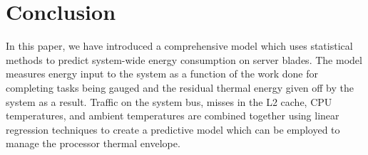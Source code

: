 \documentclass[times, 10pt, finalversion]{usetex-v1}
\begin{document}
\section{Conclusion}
\label{sec:conclusions}
In this paper, we have introduced a comprehensive model which uses
statistical methods to predict system-wide energy consumption  on server
blades.   The model measures energy input to the system as a function
of the work done for completing  tasks being gauged and the residual thermal
energy given off by the system as a result.   Traffic on the
system bus, misses in the L2 cache, CPU temperatures, and ambient
temperatures are combined together using linear regression techniques to
create a predictive model which can be employed to manage the processor
thermal envelope.
\begin{spacing}{0.3}
\begin{small}
\label{sec:references}


\end{small}
\end{spacing}
\end{document}
